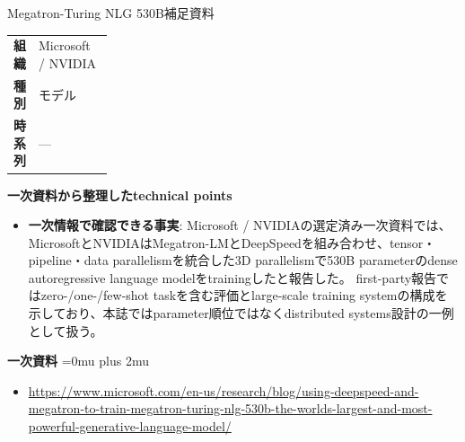 \begin{technicalnote}{Megatron-Turing NLG 530B}{補足資料}
\begingroup
\begin{tabularx}{\linewidth}{@{}>{\bfseries}p{0.22\linewidth}X@{}}
組織 & Microsoft / NVIDIA \\
種別 & モデル \\
時系列 & — \\
\end{tabularx}
\smallskip
{\bfseries 一次資料から整理したtechnical points}
\begin{itemize}[leftmargin=1.5em,itemsep=0.35em]
\item \textbf{一次情報で確認できる事実}: Microsoft / NVIDIAの選定済み一次資料では、MicrosoftとNVIDIAはMegatron-LMとDeepSpeedを組み合わせ、tensor・pipeline・data parallelismを統合した3D parallelismで530B parameterのdense autoregressive language modelをtrainingしたと報告した。 first-party報告ではzero-/one-/few-shot taskを含む評価とlarge-scale training systemの構成を示しており、本誌ではparameter順位ではなくdistributed systems設計の一例として扱う。
\end{itemize}
\begin{minipage}{\linewidth}
\begin{samepage}
{\bfseries 一次資料}
\begingroup\sloppy
\Urlmuskip=0mu plus 2mu\relax
\begin{itemize}[leftmargin=1.5em,itemsep=0.25em]
\item {\scriptsize\url{https://www.microsoft.com/en-us/research/blog/using-deepspeed-and-megatron-to-train-megatron-turing-nlg-530b-the-worlds-largest-and-most-powerful-generative-language-model/}}
\end{itemize}
\endgroup
\end{samepage}
\end{minipage}
\endgroup
\end{technicalnote}
\medskip

